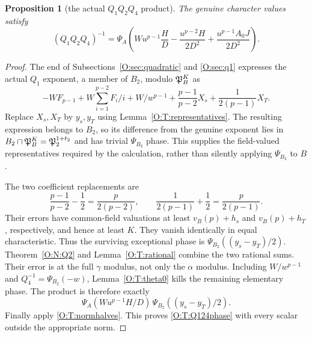 \documentclass[11pt]{amsart}
\newtheorem{proposition}[theorem]{Proposition}
\theoremstyle{definition}
\theoremstyle{remark}
\begin{document}
\begin{proposition}[the actual $Q_1Q_2Q_4$ product]\label{O:T:Q124}
The genuine character values satisfy
\begin{equation}\label{O:T:Q124phase}
 (Q_1Q_2Q_4)^{-1}
 =\Psi_A\left(
 Wu^{p-1}\frac HD-\frac{u^{p-2}H}{2D^2}
                   +\frac{u^{p-1}A_0J}{2D^2}\right).
\end{equation}
\end{proposition}
\begin{proof}
The end of Subsections~\ref{O:sec:quadratic} and \ref{O:sec:q1} expresses the actual $Q_1$ exponent, a member
of $B_2$, modulo $\mathfrak P_B^K$ as
\[
 -WF_{p-1}+W\sum_{i=1}^{p-2}F_i/i+W/w^{p-1}
       +\frac{p-1}{p-2}X_s+\frac{1}{2(p-1)}X_T.
\]
Replace $X_s,X_T$ by $y_s,y_T$ using Lemma~\ref{O:T:representatives}.
The resulting expression belongs to $B_2$, so its difference from
the genuine exponent lies in
$B_2\cap\mathfrak P_B^K=\mathfrak P_2^{1+t_2}$ and has trivial $\Psi_{B_2}$ phase.
This supplies the field-valued representatives required by the
calculation, rather than silently applying $\Psi_{B_2}$ to $B$.

The two coefficient replacements are
\[
 \frac{p-1}{p-2}-\frac12=\frac p{2(p-2)},\qquad
 \frac1{2(p-1)}+\frac12=\frac p{2(p-1)}.
\]
Their errors have common-field valuations at least
$v_B(p)+h_s$ and $v_B(p)+h_T$, respectively, and hence at least $K$.
They vanish identically in equal characteristic. Thus the surviving
exceptional phase is $\Psi_{B_2}((y_s-y_T)/2)$.
Theorem~\ref{O:N:Q2} and Lemma~\ref{O:T:rational} combine the two rational
sums. Their error is at the full $\gamma$ modulus, not only the
$\alpha$ modulus. Including $W/w^{p-1}$ and $Q_4^{-1}=\Psi_{B_2}(-w)$,
Lemma~\ref{O:T:theta0} kills the remaining elementary phase.
The product is therefore exactly
\[
 \Psi_A(Wu^{p-1}H/D)\,\Psi_{B_2}((y_s-y_T)/2).
\]
Finally apply \eqref{O:T:normhalves}. This proves \eqref{O:T:Q124phase}
with every scalar outside the appropriate norm.
\end{proof}
\end{document}
